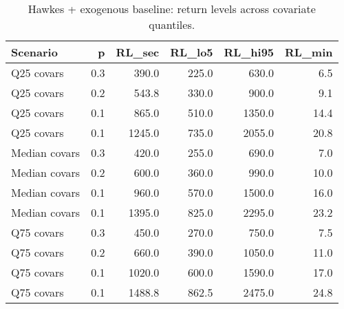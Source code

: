 \begin{table}
\caption{Hawkes + exogenous baseline: return levels across covariate quantiles.}
\label{tab:hawkes_exog_rl}
\begin{tabular}{lrrrrr}
\toprule
Scenario & p & RL_sec & RL_lo5 & RL_hi95 & RL_min \\
\midrule
Q25 covars & 0.3 & 390.0 & 225.0 & 630.0 & 6.5 \\
Q25 covars & 0.2 & 543.8 & 330.0 & 900.0 & 9.1 \\
Q25 covars & 0.1 & 865.0 & 510.0 & 1350.0 & 14.4 \\
Q25 covars & 0.1 & 1245.0 & 735.0 & 2055.0 & 20.8 \\
Median covars & 0.3 & 420.0 & 255.0 & 690.0 & 7.0 \\
Median covars & 0.2 & 600.0 & 360.0 & 990.0 & 10.0 \\
Median covars & 0.1 & 960.0 & 570.0 & 1500.0 & 16.0 \\
Median covars & 0.1 & 1395.0 & 825.0 & 2295.0 & 23.2 \\
Q75 covars & 0.3 & 450.0 & 270.0 & 750.0 & 7.5 \\
Q75 covars & 0.2 & 660.0 & 390.0 & 1050.0 & 11.0 \\
Q75 covars & 0.1 & 1020.0 & 600.0 & 1590.0 & 17.0 \\
Q75 covars & 0.1 & 1488.8 & 862.5 & 2475.0 & 24.8 \\
\bottomrule
\end{tabular}
\end{table}
